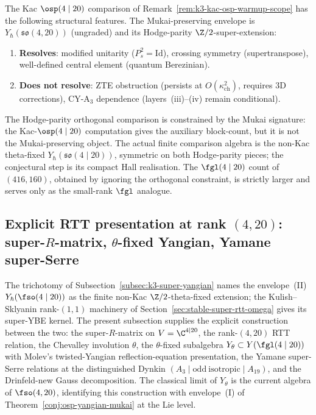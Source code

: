 \begin{remark}
\label{rem:k3-super-summary}
The Kac $\osp(4 \mid 20)$ comparison
of Remark~\ref{rem:k3-kac-osp-warmup-scope} has the following
structural features. The Mukai-preserving envelope is
$Y_\hbar(\mathfrak{so}(4, 20))$ (ungraded) and its Hodge-parity
$\Z/2$-super-extension:
\begin{enumerate}[label=(\alph*)]
\item \textbf{Resolves}: modified unitarity ($P_s^2 = \mathrm{Id}$),
 crossing symmetry (supertranspose), well-defined central element
 (quantum Berezinian).
\item \textbf{Does not resolve}: ZTE obstruction (persists at $O(\kappa_{\mathrm{ch}}^2)$,
 requires 3D corrections), CY-A$_3$ dependence (layers~(iii)--(iv)
 remain conditional).
\end{enumerate}
The Hodge-parity orthogonal comparison is constrained by the Mukai
signature: the Kac-$\osp(4\mid20)$ computation gives the auxiliary
block-count, but it is not the Mukai-preserving object. The actual
finite comparison algebra is the non-Kac theta-fixed
$Y_\hbar(\mathfrak{so}(4 \mid 20))$, symmetric on both Hodge-parity
pieces; the conjectural step is its compact Hall realisation. The
$\fgl(4 \mid 20)$ count of $(416,160)$, obtained by
ignoring the orthogonal constraint, is strictly larger and serves only
as the small-rank $\fgl$ analogue.
\end{remark}


\subsection{Explicit RTT presentation at rank \texorpdfstring{$(4, 20)$}{(4, 20)}: super-$R$-matrix, $\theta$-fixed Yangian, Yamane super-Serre}
\label{subsec:r10-explicit-rtt-4-20}

The trichotomy of Subsection~\ref{subsec:k3-super-yangian} names the
envelope~(II) $Y_\hbar(\fso(4 \mid 20))$ as the finite
non-Kac $\Z/2$-theta-fixed extension; the
Kulish--Sklyanin rank-$(1, 1)$ machinery of
Section~\ref{sec:stable-super-rtt-omega} gives its super-YBE kernel.
The present subsection supplies the explicit construction between the two:
the super-$R$-matrix on $V = \C^{4 \mid 20}$, the rank-$(4, 20)$ RTT
relation, the Chevalley involution $\theta$, the $\theta$-fixed subalgebra
$Y_\theta \subset Y(\fgl(4 \mid 20))$ with Molev's twisted-Yangian
reflection-equation presentation, the Yamane super-Serre relations at the
distinguished Dynkin $(A_3 \mid \mathrm{odd\ isotropic} \mid A_{19})$, and
the Drinfeld-new Gauss decomposition. The classical limit of $Y_\theta$
is the current algebra of $\fso(4, 20)$, identifying this construction with
envelope~(I) of Theorem~\ref{conj:osp-yangian-mukai} at the Lie level.

